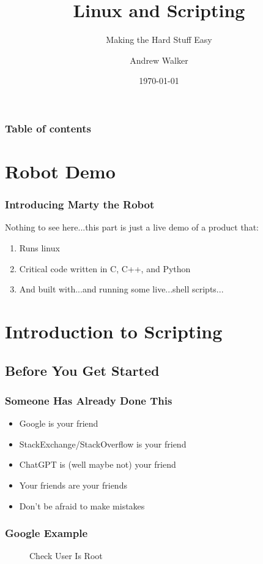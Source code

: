 \documentclass{beamer}
\begin{document}
\title{Linux and Scripting}
\subtitle{Making the Hard Stuff Easy}
\author{Andrew Walker}
\date{\today}
\begin{frame}
  \titlepage
\end{frame}

\begin{frame}\frametitle{Table of contents}\tableofcontents
\end{frame}

\section{Robot Demo}
\begin{frame}\frametitle{Introducing Marty the Robot}
  Nothing to see here...this part is just a live demo of a product that:
  \begin{enumerate}
  \item Runs linux
  \item Critical code written in C, C++, and Python
  \item And built with...and running some live...shell scripts...
  \end{enumerate}
\end{frame}

\section{Introduction to Scripting}
\subsection{Before You Get Started}
\begin{frame}\frametitle{Someone Has Already Done This}
  \begin{itemize}
  \item Google is your friend \pause
  \item StackExchange/StackOverflow is your friend \pause
  \item ChatGPT is (well maybe not) your friend \pause
  \item Your friends are your friends \pause
  \item Don't be afraid to make mistakes \pause
  \end{itemize}
\end{frame}

\begin{frame}\frametitle{Google Example}
  \begin{figure}[!htb]
    \linewidth
    \begin{center}
    \end{center}
    \caption{Check User Is Root}\label{fig:google-user-is-root}
  \end{figure}
\end{frame}
\end{document}
